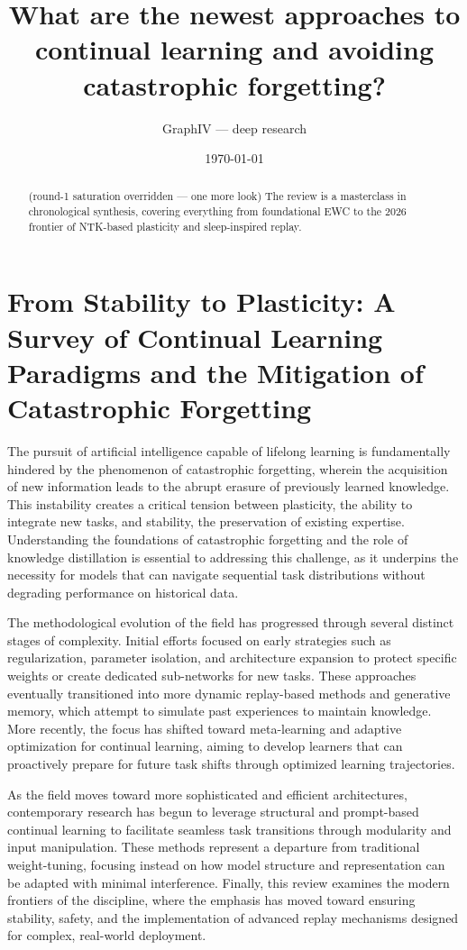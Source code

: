 \documentclass[11pt]{article}
\title{What are the newest approaches to continual learning and avoiding catastrophic forgetting?}
\author{GraphIV --- deep research}
\date{\today}
\begin{document}
\maketitle

\begin{abstract}
(round-1 saturation overridden — one more look) The review is a masterclass in chronological synthesis, covering everything from foundational EWC to the 2026 frontier of NTK-based plasticity and sleep-inspired replay.
\end{abstract}

\section{From Stability to Plasticity: A Survey of Continual Learning Paradigms and the Mitigation of Catastrophic Forgetting}

The pursuit of artificial intelligence capable of lifelong learning is fundamentally hindered by the phenomenon of catastrophic forgetting, wherein the acquisition of new information leads to the abrupt erasure of previously learned knowledge. This instability creates a critical tension between plasticity, the ability to integrate new tasks, and stability, the preservation of existing expertise. Understanding the foundations of catastrophic forgetting and the role of knowledge distillation is essential to addressing this challenge, as it underpins the necessity for models that can navigate sequential task distributions without degrading performance on historical data.

The methodological evolution of the field has progressed through several distinct stages of complexity. Initial efforts focused on early strategies such as regularization, parameter isolation, and architecture expansion to protect specific weights or create dedicated sub-networks for new tasks. These approaches eventually transitioned into more dynamic replay-based methods and generative memory, which attempt to simulate past experiences to maintain knowledge. More recently, the focus has shifted toward meta-learning and adaptive optimization for continual learning, aiming to develop learners that can proactively prepare for future task shifts through optimized learning trajectories.

As the field moves toward more sophisticated and efficient architectures, contemporary research has begun to leverage structural and prompt-based continual learning to facilitate seamless task transitions through modularity and input manipulation. These methods represent a departure from traditional weight-tuning, focusing instead on how model structure and representation can be adapted with minimal interference. Finally, this review examines the modern frontiers of the discipline, where the emphasis has moved toward ensuring stability, safety, and the implementation of advanced replay mechanisms designed for complex, real-world deployment.
\end{document}
